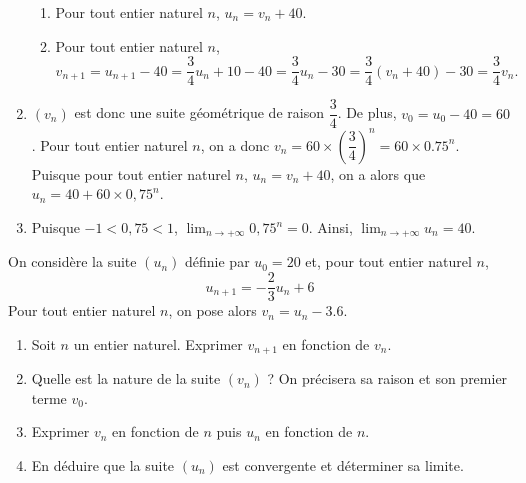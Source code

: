 \documentclass[11pt,fleqn, openany]{book} %
\begin{document}
\begin{solution}
\begin{enumerate}
\begin{enumerate}
\item Pour tout entier naturel $n$, $u_n=v_n+40$. 
\item Pour tout entier naturel $n$, \[v_{n+1} = u_{n+1}-40=\dfrac{3}{4}u_n+10-40=\dfrac{3}{4}u_n-30 = \dfrac{3}{4}(v_n+40)-30=\dfrac{3}{4}v_n.\]\end{enumerate}

\item $(v_n)$ est donc une suite géométrique de raison $\dfrac{3}{4}$. De plus, $v_0=u_0-40=60$. Pour tout entier naturel $n$, on a donc $v_n= 60 \times \left( \dfrac{3}{4}\right)^n=60\times 0.75^n$. Puisque pour tout entier naturel $n$, $u_n=v_n+40$, on a alors que $u_n=40+60 \times 0,75^n$.

\item Puisque $-1<0,75<1$, $\displaystyle \lim_{n\to + \infty} 0,75^n=0$. Ainsi, $\displaystyle \lim_{n\to + \infty} u_n = 40$.\end{enumerate}\end{solution}





\begin{exercise}[subtitle={(Suite arithmético-géométrique : moins guidé...)}]

On considère la suite $(u_n)$ définie par $u_0=20$ et, pour tout entier naturel $n$, \[u_{n+1}=-\dfrac{2}{3}u_n+6\] Pour tout entier naturel $n$, on pose alors $v_n=u_n-3.6$.

\begin{enumerate}
\item Soit $n$ un entier naturel. Exprimer $v_{n+1}$ en fonction de $v_n$.
\item Quelle est la nature de la suite $(v_n)$ ? On précisera sa raison et son premier terme $v_0$.
\item Exprimer $v_n$ en fonction de $n$ puis $u_n$ en fonction de $n$.
\item En déduire que la suite $(u_n)$ est convergente et déterminer sa limite.
\end{enumerate}\end{exercise}
\end{document}
